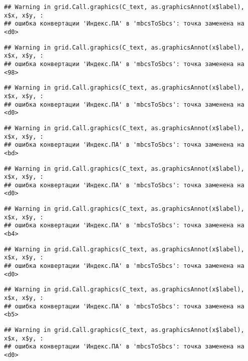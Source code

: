 \documentclass[
]{article}
\begin{document}
\begin{verbatim}
## Warning in grid.Call.graphics(C_text, as.graphicsAnnot(x$label), x$x, x$y, :
## ошибка конвертации 'Индекс.ПА' в 'mbcsToSbcs': точка заменена на <d0>
\end{verbatim}

\begin{verbatim}
## Warning in grid.Call.graphics(C_text, as.graphicsAnnot(x$label), x$x, x$y, :
## ошибка конвертации 'Индекс.ПА' в 'mbcsToSbcs': точка заменена на <98>
\end{verbatim}

\begin{verbatim}
## Warning in grid.Call.graphics(C_text, as.graphicsAnnot(x$label), x$x, x$y, :
## ошибка конвертации 'Индекс.ПА' в 'mbcsToSbcs': точка заменена на <d0>
\end{verbatim}

\begin{verbatim}
## Warning in grid.Call.graphics(C_text, as.graphicsAnnot(x$label), x$x, x$y, :
## ошибка конвертации 'Индекс.ПА' в 'mbcsToSbcs': точка заменена на <bd>
\end{verbatim}

\begin{verbatim}
## Warning in grid.Call.graphics(C_text, as.graphicsAnnot(x$label), x$x, x$y, :
## ошибка конвертации 'Индекс.ПА' в 'mbcsToSbcs': точка заменена на <d0>
\end{verbatim}

\begin{verbatim}
## Warning in grid.Call.graphics(C_text, as.graphicsAnnot(x$label), x$x, x$y, :
## ошибка конвертации 'Индекс.ПА' в 'mbcsToSbcs': точка заменена на <b4>
\end{verbatim}

\begin{verbatim}
## Warning in grid.Call.graphics(C_text, as.graphicsAnnot(x$label), x$x, x$y, :
## ошибка конвертации 'Индекс.ПА' в 'mbcsToSbcs': точка заменена на <d0>
\end{verbatim}

\begin{verbatim}
## Warning in grid.Call.graphics(C_text, as.graphicsAnnot(x$label), x$x, x$y, :
## ошибка конвертации 'Индекс.ПА' в 'mbcsToSbcs': точка заменена на <b5>
\end{verbatim}

\begin{verbatim}
## Warning in grid.Call.graphics(C_text, as.graphicsAnnot(x$label), x$x, x$y, :
## ошибка конвертации 'Индекс.ПА' в 'mbcsToSbcs': точка заменена на <d0>
\end{verbatim}
\end{document}
